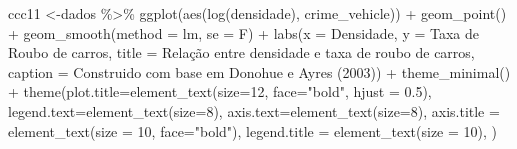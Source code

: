 \documentclass[
]{article}
\newenvironment{Shaded}{\begin{snugshade}}{\end{snugshade}}
\newcommand{\AttributeTok}[1]{\textcolor[rgb]{0.77,0.63,0.00}{#1}}
\newcommand{\DecValTok}[1]{\textcolor[rgb]{0.00,0.00,0.81}{#1}}
\newcommand{\FloatTok}[1]{\textcolor[rgb]{0.00,0.00,0.81}{#1}}
\newcommand{\FunctionTok}[1]{\textcolor[rgb]{0.00,0.00,0.00}{#1}}
\newcommand{\NormalTok}[1]{#1}
\newcommand{\OtherTok}[1]{\textcolor[rgb]{0.56,0.35,0.01}{#1}}
\newcommand{\SpecialCharTok}[1]{\textcolor[rgb]{0.00,0.00,0.00}{#1}}
\newcommand{\StringTok}[1]{\textcolor[rgb]{0.31,0.60,0.02}{#1}}
\begin{document}
\begin{Shaded}
\begin{Highlighting}[]
\NormalTok{ccc11 }\OtherTok{\textless{}{-}}\NormalTok{dados }\SpecialCharTok{\%\textgreater{}\%} 
  \FunctionTok{ggplot}\NormalTok{(}\FunctionTok{aes}\NormalTok{(}\FunctionTok{log}\NormalTok{(densidade), crime\_vehicle)) }\SpecialCharTok{+}
  \FunctionTok{geom\_point}\NormalTok{() }\SpecialCharTok{+} 
  \FunctionTok{geom\_smooth}\NormalTok{(}\AttributeTok{method =} \StringTok{\textquotesingle{}lm\textquotesingle{}}\NormalTok{, }\AttributeTok{se =}\NormalTok{ F) }\SpecialCharTok{+}
  \FunctionTok{labs}\NormalTok{(}\AttributeTok{x =} \StringTok{\textquotesingle{}Densidade\textquotesingle{}}\NormalTok{,}
       \AttributeTok{y =} \StringTok{\textquotesingle{}Taxa de Roubo de carros\textquotesingle{}}\NormalTok{,}
       \AttributeTok{title =} \StringTok{\textquotesingle{}Relação entre densidade e taxa de roubo de carros\textquotesingle{}}\NormalTok{,}
       \AttributeTok{caption =} \StringTok{\textquotesingle{}Construido com base em Donohue e Ayres (2003)\textquotesingle{}}\NormalTok{) }\SpecialCharTok{+} 
  \FunctionTok{theme\_minimal}\NormalTok{() }\SpecialCharTok{+}
  \FunctionTok{theme}\NormalTok{(}\AttributeTok{plot.title=}\FunctionTok{element\_text}\NormalTok{(}\AttributeTok{size=}\DecValTok{12}\NormalTok{, }\AttributeTok{face=}\StringTok{"bold"}\NormalTok{, }\AttributeTok{hjust =} \FloatTok{0.5}\NormalTok{),}
        \AttributeTok{legend.text=}\FunctionTok{element\_text}\NormalTok{(}\AttributeTok{size=}\DecValTok{8}\NormalTok{),}
        \AttributeTok{axis.text=}\FunctionTok{element\_text}\NormalTok{(}\AttributeTok{size=}\DecValTok{8}\NormalTok{),}
        \AttributeTok{axis.title =} \FunctionTok{element\_text}\NormalTok{(}\AttributeTok{size =} \DecValTok{10}\NormalTok{, }\AttributeTok{face=}\StringTok{"bold"}\NormalTok{),}
        \AttributeTok{legend.title =} \FunctionTok{element\_text}\NormalTok{(}\AttributeTok{size =} \DecValTok{10}\NormalTok{),}
\NormalTok{        )}



\end{Highlighting}
\end{Shaded}
\end{document}

